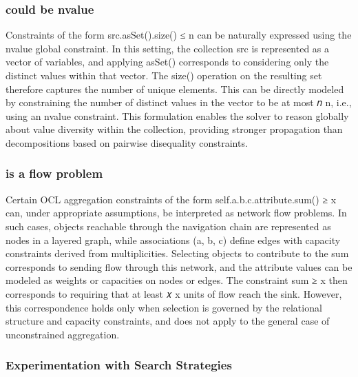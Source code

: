\subsubsection*{ could be nvalue}
Constraints of the form src.asSet().size() ≤ n can be naturally expressed using the nvalue global constraint. In this setting, the collection src is represented as a vector of variables, and applying asSet() corresponds to considering only the distinct values within that vector. The size() operation on the resulting set therefore captures the number of unique elements. This can be directly modeled by constraining the number of distinct values in the vector to be at most 
𝑛
n, i.e., using an nvalue constraint. This formulation enables the solver to reason globally about value diversity within the collection, providing stronger propagation than decompositions based on pairwise disequality constraints.

\subsubsection*{ is a flow problem}
Certain OCL aggregation constraints of the form self.a.b.c.attribute.sum() ≥ x can, under appropriate assumptions, be interpreted as network flow problems. In such cases, objects reachable through the navigation chain are represented as nodes in a layered graph, while associations (a, b, c) define edges with capacity constraints derived from multiplicities. Selecting objects to contribute to the sum corresponds to sending flow through this network, and the attribute values can be modeled as weights or capacities on nodes or edges. The constraint sum ≥ x then corresponds to requiring that at least 
𝑥
x units of flow reach the sink. However, this correspondence holds only when selection is governed by the relational structure and capacity constraints, and does not apply to the general case of unconstrained aggregation.

\subsubsection*{Experimentation with Search Strategies}

